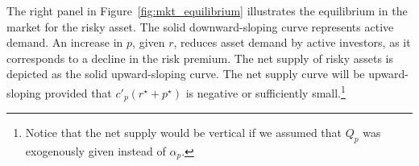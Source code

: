 
The right panel in Figure~\ref{fig:mkt_equilibrium} illustrates the equilibrium in the market for the risky asset. 
The solid downward-sloping curve represents active demand. An increase in $p$, given $r$, reduces asset demand by active investors, as it corresponds to a decline in the risk premium.  
The net supply of risky assets is depicted as the solid upward-sloping curve.
The net supply curve will be upward-sloping provided that $c'_p(r^\star+p^\star)$ is negative or sufficiently small.\footnote{
Notice that the net supply would be vertical if we assumed that $Q_p$ was exogenously given instead of $\alpha_p$. 
} 

